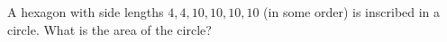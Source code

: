 A hexagon with side lengths $4,4,10,10,10,10$ (in some order) is inscribed in a circle. What is the area of the circle?
